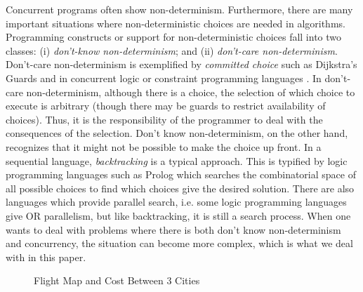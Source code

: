 Concurrent programs often show non-determinism.
Furthermore, there are many important situations where
non-deterministic choices are needed in algorithms.
Programming constructs or support for non-deterministic choices 
fall into two classes:
(i) {\em don't-know non-determinism}; and (ii) {\em don't-care non-determinism}.
Don't-care non-determinism is exemplified by {\em committed choice}
such as Dijkstra's Guards \cite{Dijkstra75:guarded} and
in concurrent logic or constraint programming languages \cite{Ueda85:guarded}.
In don't-care non-determinism, although there is a choice, the selection
of which choice to execute is arbitrary (though there may be guards to restrict
availability of choices). Thus, it is the responsibility of the programmer 
to deal with the consequences of the selection.
Don't know non-determinism, on the other hand, recognizes that it might
not be possible to make the choice up front.
In a sequential language, {\em backtracking} is a typical approach.
This is typified by logic programming languages such as Prolog
which searches the combinatorial space of all possible choices to find which
choices give the desired solution. 
There are also languages which provide parallel search, i.e. some
logic programming languages give OR parallelism, but like backtracking,
it is still a search process.
When one wants to deal with problems where there is both don't know
non-determinism and concurrency, the situation can become more complex, which
is what we deal with in this paper. 

\begin{figure}[htb]
\centering
{}
\caption{Flight Map and Cost Between 3 Cities}\label{fig:intro-flight}
\end{figure}

